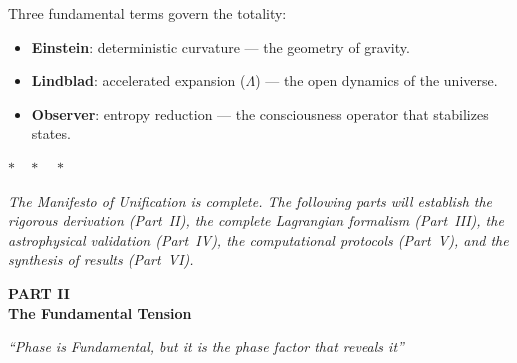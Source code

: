 \documentclass[12pt,a4paper,twoside]{article}
\begin{document}
Three fundamental terms govern the totality:
\begin{itemize}[nosep]
\item \textbf{Einstein}: deterministic curvature --- the geometry of gravity.
\item \textbf{Lindblad}: accelerated expansion ($\Lambda$) --- the open dynamics of the universe.
\item \textbf{Observer}: entropy reduction --- the consciousness operator that stabilizes states.
\end{itemize}

\bigskip
\begin{center}
$\ast\quad\ast\quad\ast$
\end{center}
\bigskip

\noindent\textit{The Manifesto of Unification is complete. The following parts will establish the rigorous derivation (Part~II), the complete Lagrangian formalism (Part~III), the astrophysical validation (Part~IV), the computational protocols (Part~V), and the synthesis of results (Part~VI).}

\newpage


\setcounter{section}{0}
\renewcommand{\thesection}{II.\arabic{section}}
\renewcommand{\theequation}{II.\arabic{equation}}
\renewcommand{\theHsection}{II.\arabic{section}}
\setcounter{footnote}{0}

\begin{center}
\vspace*{1cm}
{\huge\bfseries\color{tglblue} PART II}\\[0.5cm]
{\LARGE\bfseries\color{tglblue} The Fundamental Tension}\\[0.3cm]
\vspace*{1cm}

{\large\itshape ``Phase is Fundamental, but it is the phase factor that reveals it''}\\[0.3cm]
\vspace*{1.5cm}
\end{center}
\end{document}
